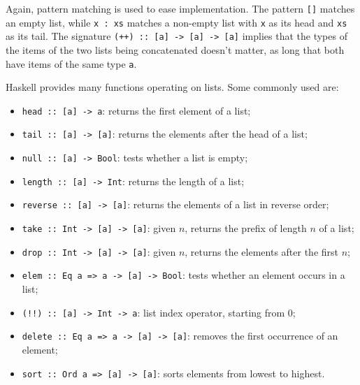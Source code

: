 \documentclass[UdineBachThesis,american,11pt]{PhdThesis}
\begin{document}
  Again, pattern matching is used to ease implementation. The pattern
  \mbox{\texttt{[]}} matches an empty list, while \mbox{\texttt{x : xs}} matches
  a non-empty list with \texttt{x} as its head and \mbox{\texttt{xs}} as its
  tail. The signature \mbox{\texttt{(++) :: [a] -> [a] -> [a]}} implies that the
  types of the items of the two lists being concatenated doesn't matter, as long
  that both have items of the same type \texttt{a}.

  Haskell provides many functions operating on lists. Some commonly used are:

  \begin{itemize}
    \item \mbox{\texttt{head :: [a] -> a}}: returns the first element of a list;

    \item \mbox{\texttt{tail :: [a] -> [a]}}: returns the elements after the
    head of a list;

    \item \mbox{\texttt{null :: [a] -> Bool}}: tests whether a list is empty;

    \item \mbox{\texttt{length :: [a] -> Int}}: returns the length of a list;

    \item \mbox{\texttt{reverse :: [a] -> [a]}}: returns the elements of a list
    in reverse order;

    \item \mbox{\texttt{take :: Int -> [a] -> [a]}}: given $n$, returns the
    prefix of length $n$ of a list;

    \item \mbox{\texttt{drop :: Int -> [a] -> [a]}}: given $n$, returns the
    elements after the first $n$;

    \item \mbox{\texttt{elem :: Eq a => a -> [a] -> Bool}}: tests whether an
    element occurs in a list;

    \item \mbox{\texttt{(!!) :: [a] -> Int -> a}}: list index operator, starting
    from $0$;

    \item \mbox{\texttt{delete :: Eq a => a -> [a] -> [a]}}: removes the first
    occurrence of an element;

    \item \mbox{\texttt{sort :: Ord a => [a] -> [a]}}: sorts elements from
    lowest to highest.
  \end{itemize}
\end{document}
